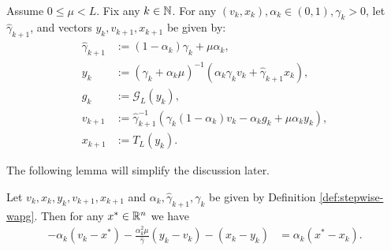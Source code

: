 \documentclass[12pt]{article}
\begin{document}
    \begin{definition}\label{def:stepwise-wapg}\;\\
        Assume $0 \le \mu < L$.
        Fix any $k \in \mathbb N$.
        For any $(v_k, x_k), \alpha_k \in (0, 1), \gamma_k > 0$, let $\hat \gamma_{k + 1}$, and vectors $y_k, v_{k + 1}, x_{k + 1}$ be given by:
        \begin{align}
            \hat \gamma_{k + 1} &:= (1 - \alpha_k)\gamma_k + \mu \alpha_k, \label{eqn:stepwise-wapg-eqn1}
            \\
            y_k &:=
            (\gamma_k + \alpha_k \mu)^{-1}(\alpha_k \gamma_k v_k + \hat\gamma_{k + 1} x_k), \label{eqn:stepwise-wapg-eqn2}
            \\
            g_k &:= \mathcal G_L (y_k), \label{eqn:stepwise-wapg-eqn3}
            \\
            v_{k + 1} &:= \hat\gamma^{-1}_{k + 1}
            (\gamma_k(1 - \alpha_k) v_k - \alpha_k g_k + \mu \alpha_k y_k), \label{eqn:stepwise-wapg-eqn4}
            \\
            x_{k + 1} &:= T_L(y_k). \label{eqn:stepwise-wapg-eqn5}
        \end{align}
    \end{definition}
    The following lemma will simplify the discussion later.
    \begin{lemma}\label{lemma:ineq-q3}
        Let $v_k, x_k, y_k, v_{k + 1}, x_{k + 1}$ and $\alpha_k, \hat \gamma_{k + 1}, \gamma_{k}$ be given by Definition \ref{def:stepwise-wapg}.
        Then for any $x^* \in \mathbb R^n$ we have
        \begin{align}
            - \alpha_k(v_k - x^*) - \frac{\alpha_k^2 \mu}{\hat \gamma}(y_k - v_k) - (x_k - y_k)
            &= \alpha_k(x^* - x_k).
            \tag{Q3}\label{eqn:Q3}
        \end{align}
    \end{lemma}
\end{document}
